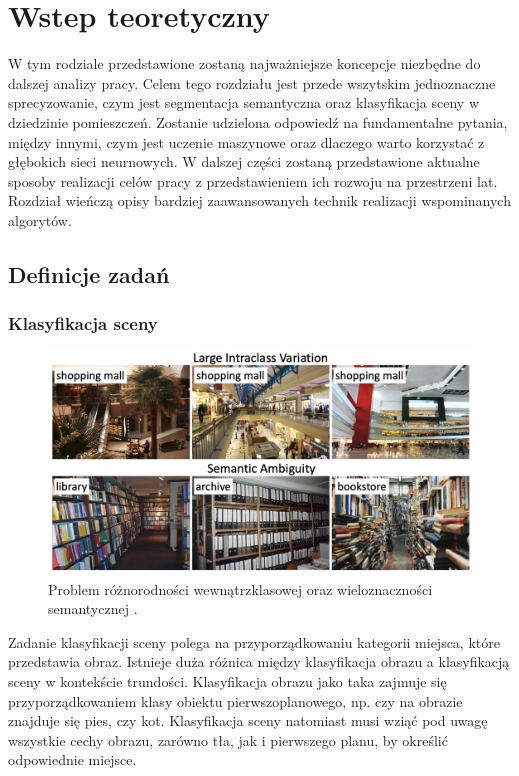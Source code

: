 \newpage %
\section{Wstep teoretyczny}
W tym rodziale przedstawione zostaną najważniejsze koncepcje niezbędne do dalszej analizy pracy. Celem tego rozdziału jest przede wszytskim jednoznaczne sprecyzowanie, czym jest segmentacja semantyczna oraz klasyfikacja sceny w dziedzinie pomieszczeń. Zostanie udzielona odpowiedź na fundamentalne pytania, między innymi, czym jest uczenie maszynowe oraz dlaczego warto korzystać z głębokich sieci neurnowych. W dalszej części zostaną przedstawione aktualne sposoby realizacji celów pracy z przedstawieniem ich rozwoju na przestrzeni lat. Rozdział wieńczą opisy bardziej zaawansowanych technik realizacji wspominanych algorytów.
\subsection{Definicje zadań}
\subsubsection{Klasyfikacja sceny}
\begin{figure}[ht!]
    \includegraphics[width=\textwidth]{img/scene_class.png}
    \caption{Problem różnorodności wewnątrzklasowej oraz wieloznaczności semantycznej \cite{zeng2021deep}.}
    \label{fig:scene-class}
\end{figure}

Zadanie klasyfikacji sceny polega na przyporządkowaniu kategorii miejsca, które przedstawia obraz. Istnieje duża różnica między klasyfikacja obrazu a klasyfikacją sceny w kontekście trundości. Klasyfikacja obrazu jako taka zajmuje się przyporządkowaniem klasy obiektu pierwszoplanowego, np. czy na obrazie znajduje się pies, czy kot. Klasyfikacja sceny natomiast musi wziąć pod uwagę wszystkie cechy obrazu, zarówno tła, jak i pierwszego planu, by określić odpowiednie miejsce. 

